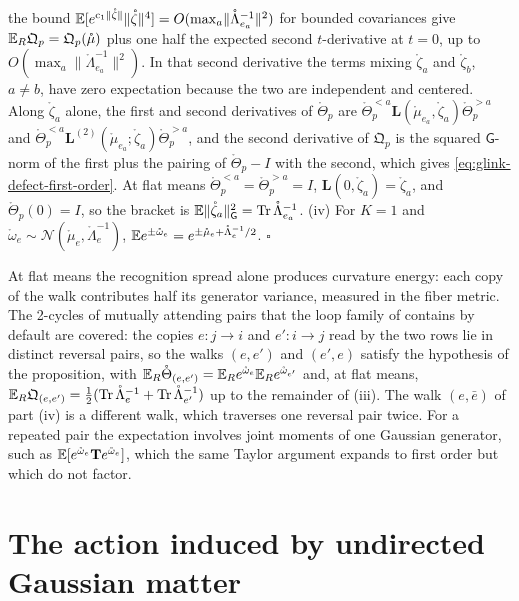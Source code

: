 the bound
\(\mathbb E[e^{\mathrm c_1\lVert\mathring\zeta\rVert}\lVert\mathring\zeta\rVert^4]=O(\max_a\lVert\mathring\Lambda_{e_a}^{-1}\rVert^2)\)
for bounded covariances give \(\mathbb E_R\mathfrak Q_p=\mathfrak Q_p(\mathring\mu)\) plus one half the expected
second \(t\)-derivative at \(t=0\), up to \(O(\max_a\lVert\mathring\Lambda_{e_a}^{-1}\rVert^2)\). In that second
derivative the terms mixing \(\mathring\zeta_a\) and \(\mathring\zeta_b\), \(a\neq b\), have zero expectation
because the two are independent and centered. Along \(\mathring\zeta_a\) alone, the first and second
derivatives of \(\mathring\Theta_p\) are \(\mathring\Theta^{<a}_p\mathbf L(\mathring\mu_{e_a},\mathring\zeta_a)\mathring\Theta^{>a}_p\)
and \(\mathring\Theta^{<a}_p\mathbf L^{(2)}(\mathring\mu_{e_a};\mathring\zeta_a)\mathring\Theta^{>a}_p\), and the second
derivative of \(\mathfrak Q_p\) is the squared \(\mathsf G\)-norm of the first plus the pairing of
\(\mathring\Theta_p-I\) with the second, which gives \eqref{eq:glink-defect-first-order}. At flat means
\(\mathring\Theta^{<a}_p=\mathring\Theta^{>a}_p=I\), \(\mathbf L(0,\mathring\zeta_a)=\mathring\zeta_a\), and
\(\mathring\Theta_p(0)=I\), so the bracket is \(\mathbb E\lVert\mathring\zeta_a\rVert_{\mathsf G}^2=\operatorname{Tr}\mathring\Lambda_{e_a}^{-1}\).
(iv) For \(K=1\) and \(\mathring\omega_e\sim\mathcal N(\mathring\mu_e,\mathring\Lambda_e^{-1})\),
\(\mathbb E e^{\pm\mathring\omega_e}=e^{\pm\mathring\mu_e+\mathring\Lambda_e^{-1}/2}\). \hfill$\square$

At flat means the recognition spread alone produces curvature energy: each copy of the walk
contributes half its generator variance, measured in the fiber metric. The 2-cycles of mutually
attending pairs that the loop family of  contains by default are covered:
the copies \(e:j\to i\) and \(e':i\to j\) read by the two rows lie in distinct reversal pairs, so the walks
\((e,e')\) and \((e',e)\) satisfy the hypothesis of the proposition, with
\(\mathbb E_R\mathring\Theta_{(e,e')}=\mathbb E_Re^{\mathring\omega_e}\mathbb E_Re^{\mathring\omega_{e'}}\) and, at flat means,
\(\mathbb E_R\mathfrak Q_{(e,e')}=\tfrac12(\operatorname{Tr}\mathring\Lambda_e^{-1}+\operatorname{Tr}\mathring\Lambda_{e'}^{-1})\) up to the remainder of
(iii). The walk \((e,\bar e)\) of part (iv) is a different walk, which traverses one reversal pair twice. For a repeated pair the
expectation involves joint moments of one Gaussian generator, such as
\(\mathbb E[e^{\mathring\omega_e}\mathbf Te^{\mathring\omega_e}]\), which the same Taylor argument expands to first
order but which do not factor.

\section{The action induced by undirected Gaussian matter}
\label{sec:glink-induced}


